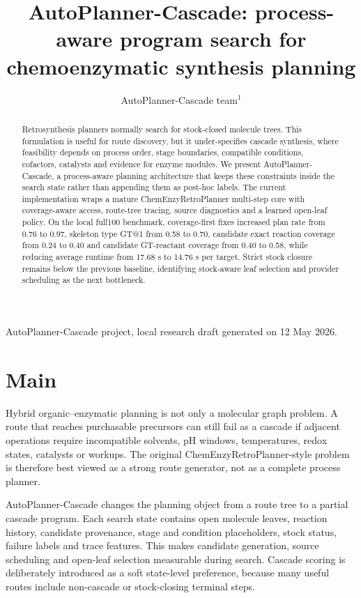 \documentclass{nature}
\title{AutoPlanner-Cascade: process-aware program search for chemoenzymatic synthesis planning}
\author{AutoPlanner-Cascade team$^{1}$}
\begin{document}
\maketitle

\begin{affiliations}
\item AutoPlanner-Cascade project, local research draft generated on 12 May 2026.
\end{affiliations}

\begin{abstract}
Retrosynthesis planners normally search for stock-closed molecule trees. This formulation is useful for route discovery, but it under-specifies cascade synthesis, where feasibility depends on process order, stage boundaries, compatible conditions, cofactors, catalysts and evidence for enzyme modules. We present AutoPlanner-Cascade, a process-aware planning architecture that keeps these constraints inside the search state rather than appending them as post-hoc labels. The current implementation wraps a mature ChemEnzyRetroPlanner multi-step core with coverage-aware access, route-tree tracing, source diagnostics and a learned open-leaf policy. On the local full100 benchmark, coverage-first fixes increased plan rate from 0.76 to 0.97, skeleton type GT@1 from 0.58 to 0.70, candidate exact reaction coverage from 0.24 to 0.40 and candidate GT-reactant coverage from 0.40 to 0.58, while reducing average runtime from 17.68 s to 14.76 s per target. Strict stock closure remains below the previous baseline, identifying stock-aware leaf selection and provider scheduling as the next bottleneck.
\end{abstract}

\section*{Main}
Hybrid organic--enzymatic planning is not only a molecular graph problem. A route that reaches purchasable precursors can still fail as a cascade if adjacent operations require incompatible solvents, pH windows, temperatures, redox states, catalysts or workups. The original ChemEnzyRetroPlanner-style problem is therefore best viewed as a strong route generator, not as a complete process planner.

AutoPlanner-Cascade changes the planning object from a route tree to a partial cascade program. Each search state contains open molecule leaves, reaction history, candidate provenance, stage and condition placeholders, stock status, failure labels and trace features. This makes candidate generation, source scheduling and open-leaf selection measurable during search. Cascade scoring is deliberately introduced as a soft state-level preference, because many useful routes include non-cascade or stock-closing terminal steps.
\end{document}
